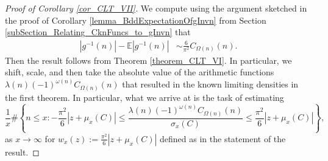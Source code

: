 \documentclass[11pt,reqno,a4letter]{article}
\numberwithin{figure}{section}
\numberwithin{table}{section}
\theoremstyle{plain}
\numberwithin{theorem}{section}
\theoremstyle{definition}
\begin{document}
\begin{proof}[Proof of Corollary \ref{cor_CLT_VII}]
We compute using the argument sketched in the proof of 
Corollary \ref{lemma_BddExpectationOfgInvn} from 
Section \ref{subSection_Relating_CknFuncs_to_gInvn} that 
\begin{align*} 
|g^{-1}(n)| - \mathbb{E}|g^{-1}(n)| & \sim \frac{6}{\pi^2} C_{\Omega(n)}(n). 
\end{align*} 
Then the result follows from Theorem \ref{theorem_CLT_VI}. 
In particular, we shift, scale, and then take the absolute value of the 
arithmetic functions $\lambda(n) (-1)^{\omega(n)} C_{\Omega(n)}(n)$ that 
resulted in the known limiting densities in the first theorem. 
In particular, what we arrive at is the task of estimating 
\[
\frac{1}{x} \#\left\{n \leq x: -\frac{\pi^2}{6} |z + \mu_x(C)| \leq \frac{ 
     \lambda(n) (-1)^{\omega(n)} C_{\Omega(n)}(n)}{\sigma_x(C)} \leq 
     \frac{\pi^2}{6} |z + \mu_x(C)|\right\}, 
\]
as $x \rightarrow \infty$ for $w_x(z) := \frac{\pi^2}{6} |z + \mu_x(C)|$ 
defined as in the statement of the result. 
\end{proof} 
\end{document}
